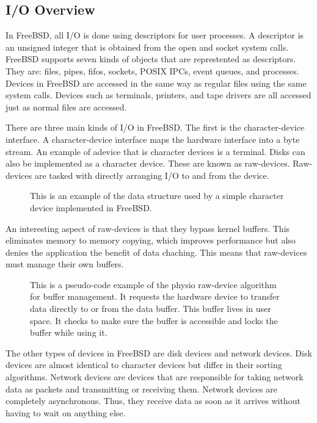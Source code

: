 \documentclass[journal,letterpaper,draftclsnofoot,onecolumn,10pt]{IEEEtran}
\begin{document}
\subsection{I/O Overview}
In FreeBSD, all I/O is done using descriptors for user processes. A descriptor is an unsigned integer that is obtained from the open and socket system calls. FreeBSD supports seven kinds of objects that are represtented as descriptors. They are: files, pipes, fifos, sockets, POSIX IPCs, event queues, and processes. Devices in FreeBSD are accessed in the same way as regular files using the same system calls. Devices such as terminals, printers, and tape drivers are all accessed just as normal files are accessed.\cite{mn15}

There are three main kinds of I/O in FreeBSD. The first is the character-device interface. A character-device interface maps the hardware interface into a byte stream. An example of adevice that is character devices is a terminal. Disks can also be implemented as a character device. These are known as raw-devices. Raw-devices are tasked with directly arranging I/O to and from the device.\cite{mn15}

\begin{figure}[H]
   
   \caption{This is an example of the data structure used by a simple character device implemented in FreeBSD.}
\end{figure}

An interesting aspect of raw-devices is that they bypass kernel buffers. This eliminates memory to memory copying, which improves performance but also denies the application the benefit of data chaching. This means that raw-devices must manage their own buffers.\cite{mn15}

\begin{figure}[H]
   
   \caption{This is a pseudo-code example of the physio raw-device algorithm for buffer management. It requests the hardware device to transfer data directly to or from the data buffer. This buffer lives in user space. It checks to make sure the buffer is accessible and locks the buffer while using it.}
\end{figure}

The other types of devices in FreeBSD are disk devices and network devices. Disk devices are almost identical to character devices but differ in their sorting algorithms. Network devices are devices that are responsible for taking network data as packets and transmitting or receiving them. Network devices are completely asynchronous. Thus, they receive data as soon as it arrives without having to wait on anything else.\cite{mn15}
\end{document}
